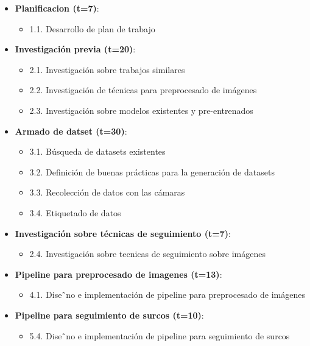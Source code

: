 \documentclass[
11pt, %
codirector, %
]{charter}
\begin{document}
\begin{itemize}

\item \textbf{Planificacion (t=7)}:
\begin{itemize}
\item 1.1. Desarrollo de plan de trabajo
\end{itemize}

\item \textbf{Investigación previa (t=20)}:
\begin{itemize}
\item 2.1. Investigación sobre trabajos similares
\item 2.2. Investigación de técnicas para preprocesado de imágenes
\item 2.3. Investigación sobre modelos existentes y pre-entrenados
\end{itemize}

\item \textbf{Armado de datset (t=30)}:
\begin{itemize}
\item 3.1. Búsqueda de datasets existentes
\item 3.2. Definición de buenas prácticas para la generación de datasets
\item 3.3. Recolección de datos con las cámaras
\item 3.4. Etiquetado de datos
\end{itemize}

\item \textbf{Investigación sobre técnicas de seguimiento (t=7)}:
\begin{itemize}
\item 2.4. Investigación sobre tecnicas de seguimiento sobre imágenes
\end{itemize}

\item \textbf{Pipeline para preprocesado de imagenes (t=13)}:
\begin{itemize}
\item 4.1. Dise˜no e implementación de pipeline para preprocesado de imágenes
\end{itemize}

\item \textbf{Pipeline para seguimiento de surcos (t=10)}:
\begin{itemize}
\item 5.4. Dise˜no e implementación de pipeline para seguimiento de surcos
\end{itemize}


\end{itemize}
\end{document}
